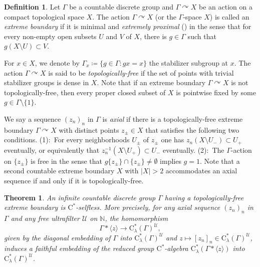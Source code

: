 \documentclass[12pt,nosumlimits,nonamelimits]{amsart}
\newtheorem{thm}{Theorem}
\theoremstyle{remark}
\theoremstyle{definition}
\newtheorem*{defn}{Definition}
\newcommand{\IN}{\mathbb{N}}
\newcommand{\cU}{\mathcal{U}}
\newcommand{\Ga}{\Gamma}
\newcommand{\acts}{\curvearrowright}
\newcommand{\ip}[1]{\mathopen{\langle}#1\mathclose{\rangle}}
\begin{document}
\begin{defn}
Let $\Ga$ be a countable discrete group and $\Ga\acts X$ 
be an action on a compact topological space $X$. 
The action $\Ga\acts X$ (or the $\Ga$-space $X$) 
is called an \emph{extreme boundary} 
if it is minimal and \emph{extremely proximal} (\cite{glasner}) 
in the sense that for every non-empty 
open subsets $U$ and $V$ of $X$, there is 
$g\in\Ga$ such that $g(X\setminus U)\subset V$.

For $x\in X$, we denote by $\Ga_x \coloneq \{ g\in\Ga : gx=x \}$ 
the stabilizer subgroup at $x$. 
The action $\Ga\acts X$ is said to be 
\emph{topologically-free} if the set of points 
with trivial stabilizer groups is dense in $X$. 
Note that if an extreme boundary $\Ga\acts X$ 
is not topologically-free, then every proper 
closed subset of $X$ is pointwise fixed by some 
$g\in\Ga\setminus\{1\}$. 

We say a sequence $(z_n)_n$ in $\Ga$ is \emph{axial} if 
there is a topologically-free extreme boundary 
$\Ga\acts X$ with distinct points $z_\pm\in X$ 
that satisfies the following two conditions.
(1):~For every neighborhoods $U_\pm$ of $z_\pm$ 
one has 
$z_n (X\setminus U_-) \subset U_+$
eventually, or equivalently that 
$z_n^{-1}( X \setminus U_+ ) \subset U_-$ eventually. 
(2):~The $\Ga$-action on $\{z_\pm\}$ is free 
in the sense that $g\{z_\pm\}\cap\{z_\pm\}\neq\emptyset$ 
implies $g=1$. 
Note that a second countable extreme boundary $X$ 
with $|X|>2$ accommodates an axial sequence if and only if 
it is topologically-free. 
\end{defn}

%
\begin{thm}\label{thm:main}
An infinite countable discrete group $\Ga$ having 
a topologically-free extreme boundary is 
$\mathrm{C}^*$-selfless. 
More precisely, for any axial sequence $(z_n)_n$ in $\Ga$ 
and any free ultrafilter $\cU$ on $\IN$, the homomorphism 
\[
\Ga*\ip{z}\to\mathrm{C}^*_\lambda(\Ga)^\cU,
\]
given by the diagonal embedding of 
$\Ga$ into $\mathrm{C}^*_\lambda(\Ga)^\cU$ 
and $z\mapsto [z_n]_n \in \mathrm{C}^*_\lambda(\Ga)^\cU$, 
induces a faithful embedding of the reduced 
group $\mathrm{C}^*$-alge\-bra $\mathrm{C}^*_\lambda(\Ga*\ip{z})$ 
into $\mathrm{C}^*_\lambda(\Ga)^\cU$.
\end{thm}
\end{document}
